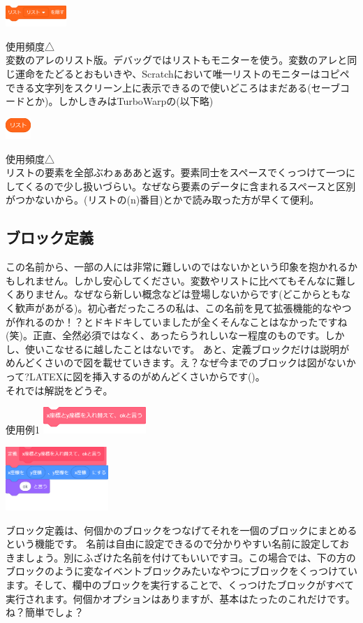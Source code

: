 \documentclass[b5paper,10pt]{jsarticle}
\begin{document}
\begin{multicols*}{3}
\begin{itembox}{10}
\includegraphics[height=8mm]{images/lists_11.png}
\end{itembox}
使用頻度△\\
変数のアレのリスト版。デバッグではリストもモニターを使う。変数のアレと同じ運命をたどるとおもいきや、Scratchにおいて唯一リストのモニターはコピペできる文字列をスクリーン上に表示できるので使いどころはまだある(セーブコードとか)。しかしきみはTurboWarpの(以下略)
\begin{itembox}{11}
\includegraphics[height=8mm]{images/lists_12.png}
\end{itembox}
使用頻度△\\
リストの要素を全部ぶわぁああと返す。要素同士をスペースでくっつけて一つにしてくるので少し扱いづらい。なぜなら要素のデータに含まれるスペースと区別がつかないから。(リストの(n)番目)とかで読み取った方が早くて便利。

\subsection{ブロック定義}
この名前から、一部の人には非常に難しいのではないかという印象を抱かれるかもしれません。しかし安心してください。変数やリストに比べてもそんなに難しくありません。なぜなら新しい概念などは登場しないからです(どこからともなく歓声があがる)。初心者だったころの私は、この名前を見て拡張機能的なやつが作れるのか！？とドキドキしていましたが全くそんなことはなかったですね(笑)。正直、全然必須ではなく、あったらうれしいなー程度のものです。しかし、使いこなせるに越したことはないです。
あと、定義ブロックだけは説明がめんどくさいので図を載せていきます。え？なぜ今までのブロックは図がないかって?LATEXに図を挿入するのがめんどくさいからです()。\\

それでは解説をどうぞ。
\begin{itembox}{使用例1}
\includegraphics[width=39mm]{images/teigi_1.png}

\includegraphics[width=39mm]{images/teigi_2.png}
\end{itembox}
ブロック定義は、何個かのブロックをつなげてそれを一個のブロックにまとめるという機能です。
名前は自由に設定できるので分かりやすい名前に設定しておきましょう。別にふざけた名前を付けてもいいですヨ。この場合では、下の方のブロックのように変なイベントブロックみたいなやつにブロックをくっつけています。そして、欄中のブロックを実行することで、くっつけたブロックがすべて実行されます。何個かオプションはありますが、基本はたったのこれだけです。ね？簡単でしょ？


\end{multicols*}
\end{document}
